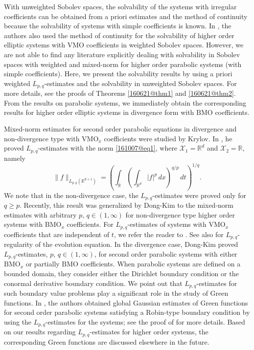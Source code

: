 \documentclass[reqno]{amsart}
\numberwithin{equation}{section}
\theoremstyle{plain}
\theoremstyle{definition}
\theoremstyle{remark}
\begin{document}
With unweighted Sobolev spaces, the solvability of the systems with irregular coefficients can be obtained from a priori estimates and the method of continuity because the solvability of systems with simple coefficients  is known.
In \cite{MR1980981}, the authors also used the method of continuity for the solvability of higher order elliptic systems with VMO coefficients in weighted Sobolev spaces.
However, we are not able to find any literature explicitly dealing with solvability in Sobolev spaces with weighted and mixed-norm for higher order parabolic systems (with simple coefficients). 
Here, we present the solvability results by using  a priori weighted $L_{p,q}$-estimates and the solvability in unweighted Sobolev spaces. 
For more details, see the proofs of Theorems \ref{160621@thm1} and \ref{160621@thm2}.
From the results on parabolic systems, we immediately obtain the corresponding results for higher order elliptic systems in divergence form with ${\mathrm{BMO}}$ coefficients. 

Mixed-norm estimates for second order parabolic equations in divergence and non-divergence type with ${\mathrm{VMO}}_x$ coefficients were studied by Krylov.
In \cite{MR2352490}, he proved $L_{p,q}$-estimates with the norm \eqref{161007@eq1}, where  ${\mathcal{X}}_1={\mathbb{R}}^d$ and  ${\mathcal{X}}_2={\mathbb{R}}$, namely
$$
\|f\|_{L_{p,q}({\mathbb{R}}^{d+1})}=\left(\int_{\mathbb{R}}\left(\int_{{\mathbb{R}}^d}|f|^p\,dx\right)^{q/p}\,dt\right)^{1/q}. 
$$
We note that in the non-divergence case, the $L_{p,q}$-estimates  were proved only for $q\ge p$.
Recently, this result was generalized by Dong-Kim \cite{arXiv:1603.07844v1} to the mixed-norm estimates with arbitrary $p,\,q\in (1,\infty)$ for non-divergence type higher order systems with ${\mathrm{BMO}}_x$ coefficients.
For $L_{p,q}$-estimates of systems with ${\mathrm{VMO}}_x$ coefficients that are independent of $t$, we refer the reader to \cite{MR2286441}.
See also \cite{arXiv:1510.07643v2, arXiv:1410.6394v2,MR2982717} for $L_{p,q}$-regularity of the  evolution equation.
In the divergence case, Dong-Kim \cite{MR2764911} proved $L_{p,q}$-estimates, $p,\,q\in (1,\infty)$, for second order parabolic systems with  either ${\mathrm{BMO}}_x$ or partially ${\mathrm{BMO}}$ coefficients.
When parabolic systems are defined on a bounded domain, they consider either the Dirichlet boundary condition or the conormal derivative boundary condition. 
We point out that $L_{p,q}$-estimates for such boundary value problems play a significant role in the study  of Green functions.
In \cite{MR3261109}, the authors obtained  global Gaussian estimates of Green functions for second order parabolic systems satisfying a Robin-type boundary condition by using the $L_{p,q}$-estimates for the systems; see the proof of \cite[Theorem 3.3]{MR3261109} for more details.
Based on our results regarding $L_{p,q}$-estimates for higher order systems, the corresponding Green functions are discussed elsewhere in the future.
\end{document}
